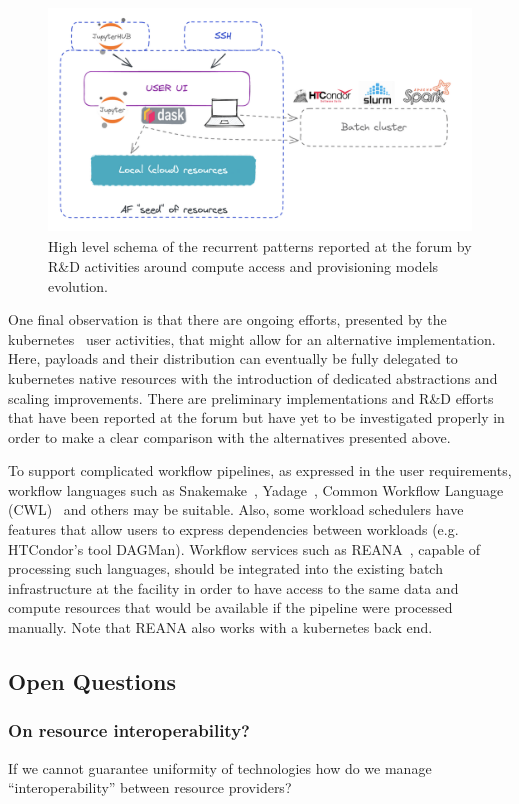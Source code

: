 \begin{figure}
    \centering
    \includegraphics[height=6cm]{fig/schema.png}
    \caption{High level schema of the recurrent patterns reported at the forum by R\&D activities around compute access and provisioning models evolution.}
    \label{fig:AFschema}
\end{figure}

One final observation is that there are ongoing efforts, presented by the kubernetes~\cite{k8s} user activities, that might allow for an alternative implementation. Here, payloads and their distribution can eventually be fully delegated to kubernetes native resources with the introduction of dedicated abstractions and scaling improvements. There are preliminary implementations and R\&D efforts that have been reported at the forum but have yet to be investigated properly in order to make a clear comparison with the alternatives presented above.

To support complicated workflow pipelines, as expressed in the user requirements, workflow languages such as Snakemake~\cite{snakemake}, Yadage~\cite{yadage}, Common Workflow Language (CWL)~\cite{cwl} and others may be suitable. Also, some workload schedulers have features that allow users to express dependencies between workloads (e.g. HTCondor's tool DAGMan). Workflow services such as REANA~\cite{reana}, capable of processing such languages, should be integrated into the existing batch infrastructure at the facility in order to have access to the same data and compute resources that would be available if the pipeline were processed manually. Note that REANA also works with a kubernetes back end. 

\subsection*{Open Questions}

\subsubsection*{On resource interoperability?} If we cannot guarantee uniformity of technologies how do we manage “interoperability” between resource providers?

